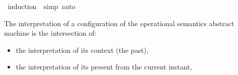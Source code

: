 \begin{isabellebody}
%
\isadelimproof
%
\endisadelimproof
%
\isatagproof
{}\isamarkupfalse%
\ {\isacharparenleft}induction\ {\isasymPhi}\ simp{\isacharcomma}\ auto{\isacharparenright}%
\endisatagproof
{\isafoldproof}%
%
\isadelimproof
%
\endisadelimproof
%
\isadelimdocument
%
\endisadelimdocument
%
\isatagdocument
%
\isamarkuptrue%
%
\endisatagdocument
{\isafolddocument}%
%
\isadelimdocument
%
\endisadelimdocument
%
\begin{isamarkuptext}%
The interpretation of a configuration of the operational semantics abstract 
machine is the intersection of:

%
\begin{itemize}%
\item the interpretation of its context (the past),

\item the interpretation of its present from the current instant,


\end{itemize}
\end{isamarkuptext}
\end{isabellebody}
